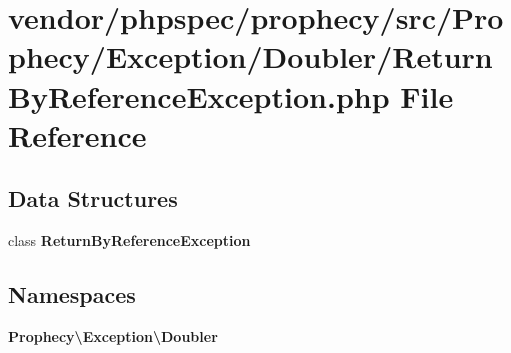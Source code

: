 \section{vendor/phpspec/prophecy/src/\+Prophecy/\+Exception/\+Doubler/\+Return\+By\+Reference\+Exception.php File Reference}
\label{_return_by_reference_exception_8php}
\subsection*{Data Structures}
\begin{DoxyCompactItemize}
\item 
class {\bf Return\+By\+Reference\+Exception}
\end{DoxyCompactItemize}
\subsection*{Namespaces}
\begin{DoxyCompactItemize}
\item 
 {\bf Prophecy\textbackslash{}\+Exception\textbackslash{}\+Doubler}
\end{DoxyCompactItemize}
